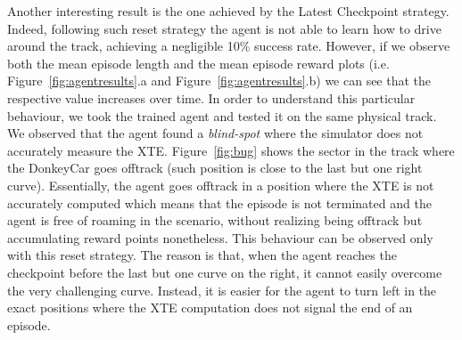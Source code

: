 Another interesting result is the one achieved by the Latest Checkpoint strategy. Indeed, following such reset strategy the agent is not able to learn how to drive around the track, achieving a negligible 10\% success rate. However, if we observe both the mean episode length and the mean episode reward plots (i.e. Figure~\ref{fig:agentresults}.a and Figure~\ref{fig:agentresults}.b) we can see that the respective value increases over time. In order to understand this particular behaviour, we took the trained agent and tested it on the same physical track. We observed that the agent found a \textit{blind-spot} where the simulator does not accurately measure the XTE. Figure~\ref{fig:bug} shows the sector in the track where the DonkeyCar goes offtrack (such position is close to the last but one right curve). Essentially, the agent goes offtrack in a position where the XTE is not accurately computed which means that the episode is not terminated and the agent is free of roaming in the scenario, without realizing being offtrack but accumulating reward points nonetheless. This behaviour can be observed only with this reset strategy. The reason is that, when the agent reaches the checkpoint before the last but one curve on the right, it cannot easily overcome the very challenging curve. Instead, it is easier for the agent to turn left in the exact positions where the XTE computation does not signal the end of an episode.


